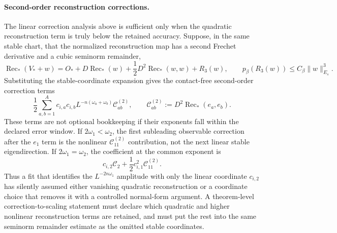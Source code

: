\paragraph{Second-order reconstruction corrections.}
The linear correction analysis above is sufficient only when the quadratic
reconstruction term is truly below the retained accuracy.  Suppose, in the
same stable chart, that the normalized reconstruction map has a second
Frechet derivative and a cubic seminorm remainder,
\[
  \operatorname{Rec}_{\ast}(V_\ast+w)
  =
  O_\ast+D\operatorname{Rec}_{\ast}(w)
  +\frac12D^2\operatorname{Rec}_{\ast}(w,w)
  +R_3(w),
  \qquad
  p_\beta(R_3(w))\le C_\beta\|w\|_{E_s}^3 .
\]
Substituting the stable-coordinate expansion gives the contact-free
second-order correction terms
\begin{equation}
  \frac12
  \sum_{a,b=1}^{A}
    c_{i,a}c_{i,b}
    L^{-n(\omega_a+\omega_b)}
    \mathcal C^{(2)}_{ab},
  \qquad
  \mathcal C^{(2)}_{ab}
  :=
  D^2\operatorname{Rec}_{\ast}(e_a,e_b).
  \label{eq:second-order-reconstruction-correction-terms}
\end{equation}
These terms are not optional bookkeeping if their exponents fall within the
declared error window.  If \(2\omega_1<\omega_2\), the first subleading
observable correction after the \(e_1\) term is the nonlinear
\(\mathcal C^{(2)}_{11}\) contribution, not the next linear stable
eigendirection.  If \(2\omega_1=\omega_2\), the coefficient at the common
exponent is
\[
  c_{i,2}\mathcal C_2+\frac12c_{i,1}^2\mathcal C^{(2)}_{11}.
\]
Thus a fit that identifies the \(L^{-2n\omega_1}\) amplitude with only the
linear coordinate \(c_{i,2}\) has silently assumed either vanishing quadratic
reconstruction or a coordinate choice that removes it with a controlled
normal-form argument.  A theorem-level correction-to-scaling statement must
declare which quadratic and higher nonlinear reconstruction terms are
retained, and must put the rest into the same seminorm remainder estimate as
the omitted stable coordinates.

